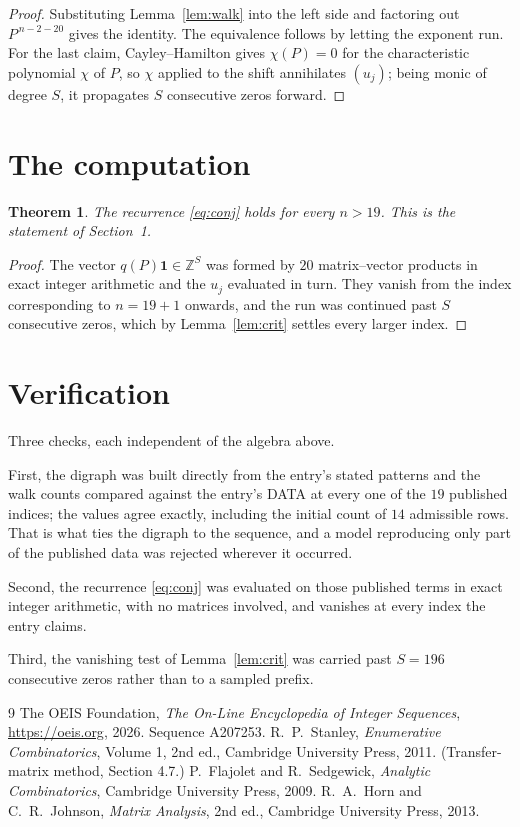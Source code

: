 \documentclass[11pt,a4paper]{article}
\theoremstyle{plain}
\newtheorem{theorem}{Theorem}
\theoremstyle{definition}
\begin{document}
\begin{proof}
Substituting Lemma~\ref{lem:walk} into the left side and factoring out
$P^{\,n-2-20}$ gives the identity. The equivalence follows by letting the exponent
run. For the last claim, Cayley--Hamilton gives $\chi(P)=0$ for the characteristic
polynomial $\chi$ of $P$, so $\chi$ applied to the shift annihilates $(u_j)$; being monic of
degree $S$, it propagates $S$ consecutive zeros forward.
\end{proof}

\section{The computation}

\begin{theorem}
The recurrence \eqref{eq:conj} holds for every $n>19$. This is the statement of
Section~1.
\end{theorem}

\begin{proof}
The vector $q(P)\mathbf{1}\in\mathbb{Z}^{S}$ was formed by $20$ matrix--vector
products in exact integer arithmetic and the $u_j$ evaluated in turn. They vanish from the
index corresponding to $n=19+1$ onwards, and the run was continued past $S$ consecutive
zeros, which by Lemma~\ref{lem:crit} settles every larger index.
\end{proof}

\section{Verification}

Three checks, each independent of the algebra above.

First, the digraph was built directly from the entry's stated patterns and the walk counts
compared against the entry's DATA at every one of the $19$ published indices; the
values agree exactly, including the initial count of $14$ admissible rows. That is
what ties the digraph to the sequence, and a model reproducing only part of the published
data was rejected wherever it occurred.

Second, the recurrence \eqref{eq:conj} was evaluated on those published terms in exact
integer arithmetic, with no matrices involved, and vanishes at every index the entry claims.

Third, the vanishing test of Lemma~\ref{lem:crit} was carried past $S=196$ consecutive
zeros rather than to a sampled prefix.

\begin{thebibliography}{9}
 The OEIS Foundation, \emph{The On-Line Encyclopedia of Integer
Sequences}, \url{https://oeis.org}, 2026. Sequence A207253.
 R.~P.~Stanley, \emph{Enumerative Combinatorics}, Volume 1, 2nd ed.,
Cambridge University Press, 2011. (Transfer-matrix method, Section 4.7.)
 P.~Flajolet and R.~Sedgewick, \emph{Analytic Combinatorics}, Cambridge
University Press, 2009.
 R.~A.~Horn and C.~R.~Johnson, \emph{Matrix Analysis}, 2nd ed., Cambridge
University Press, 2013.
\end{thebibliography}
\end{document}
